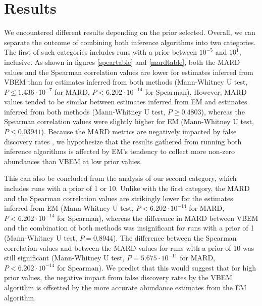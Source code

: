 \section{Results}
We encountered different results depending on the prior selected. Overall, we can separate the outcome of combining both inference algorithms into two categories. The first of such categories includes runs with a prior between $10^{-5}$ and $10^1$, inclusive. As shown in figures \ref{speartable} and \ref{mardtable}, both the $\mathrm{MARD}$ values and the Spearman correlation values are lower for estimates inferred from VBEM than for estimates inferred from both methods (Mann-Whitney U test, $P\leq 1.436 \cdot  10^{-7}$ for MARD, $P < 6.202\cdot 10^{-14}$ for Spearman). However, MARD values tended to be similar between estimates inferred from EM and estimates inferred from both methods (Mann-Whitney U test, $P\geq 0.4803$), whereas the Spearman correlation values were slightly higher for EM (Mann-Whitney U test, $P\leq 0.03941$). Because the MARD metrics are negatively impacted by false discovery rates \cite{patro_salmon_2017}, we hypothesize that the results gathered from running both inference algorithms is affected by EM’s tendency to collect more non-zero abundances than VBEM at low prior values. 

This can also be concluded from the analysis of our second category, which includes runs with a prior of 1 or 10. Unlike with the first category, the $\mathrm{MARD}$ and the Spearman correlation values are strikingly lower for the estimates inferred from EM (Mann-Whitney U test, $P < 6.202\cdot 10^{-14}$ for $\mathrm{MARD}$, $P < 6.202\cdot 10^{-14}$ for Spearman), whereas the difference in MARD between VBEM and the combination of both methods was insignificant for runs with a prior of 1 (Mann-Whitney U test, $P = 0.8944$). The difference between the Spearman correlation values and between the MARD values for runs with a prior of 10 was still significant (Mann-Whitney U test, $P = 5.675 \cdot 10^{-11}$ for $\mathrm{MARD}$, $P < 6.202\cdot 10^{-14}$ for Spearman). We predict that this would suggest that for high prior values, the negative impact from false discovery rates by the VBEM algorithm is offsetted by the more accurate abundance estimates from the EM algorithm. 
